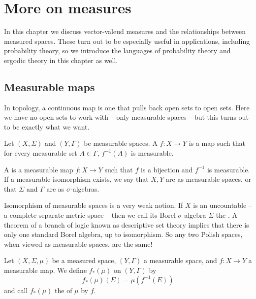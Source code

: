 
\chapter{More on measures}
In this chapter we discuss vector-valeud measures and the relationships between measured spaces.
These turn out to be especially useful in applications, including probability theory, so we introduce the languages of probability theory and ergodic theory in this chapter as well.

\section{Measurable maps}
In topology, a continuous map is one that pulls back open sets to open sets.
Here we have no open sets to work with -- only measurable spaces -- but this turns out to be exactly what we want.

\begin{definition}
Let $(X, \Sigma)$ and $(Y, \Gamma)$ be measurable spaces.
A  $f: X \to Y$ is a map such that for every measurable set $A \in \Gamma$, $f^{-1}(A)$ is measurable.

A  is a measurable map $f: X \to Y$ such that $f$ is a bijection and $f^{-1}$ is measurable.
If a measurable isomorphism exists, we say that $X,Y$ are  as measurable spaces, or that $\Sigma$ and $\Gamma$ are  as $\sigma$-algebras.
\end{definition}

\begin{example}
Isomorphism of measurable spaces is a very weak notion.
If $X$ is an uncountable  -- a complete separate metric space -- then we call its Borel $\sigma$-algebra $\Sigma$ the .
A theorem of a branch of logic known as descriptive set theory implies that there is only one standard Borel algebra, up to isomorphism.
So any two Polish spaces, when viewed as measurable spaces, are the same!
\end{example}

\begin{definition}
Let $(X, \Sigma, \mu)$ be a measured space, $(Y, \Gamma)$ a measurable space, and $f: X \to Y$ a measurable map.
We define $f_*(\mu)$ on $(Y, \Gamma)$ by
$$f_*(\mu)(E) = \mu(f^{-1}(E))$$
and call $f_*(\mu)$ the  of $\mu$ by $f$.
\end{definition}

